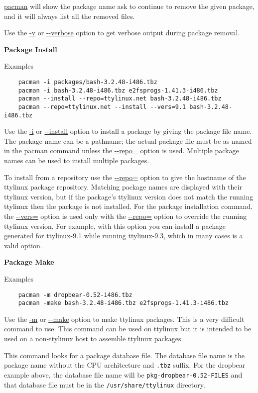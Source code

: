 \documentclass[10pt]{article}
\begin{document}
\url{pacman} will show the package name ask to continue to remove the given
package, and it will always list all the removed files.

Use the \url{-v} or \url{--verbose} option to get verbose output during package
removal.

{\bf Package Install}

Examples
\begin{lstlisting}
	pacman -i packages/bash-3.2.48-i486.tbz
	pacman -i bash-3.2.48-i486.tbz e2fsprogs-1.41.3-i486.tbz
	pacman --install --repo=ttylinux.net bash-3.2.48-i486.tbz
	pacman --repo=ttylinux.net --install --vers=9.1 bash-3.2.48-i486.tbz
\end{lstlisting}

Use the \url{-i} or \url{--install} option to install a package by giving the
package file name. The package name can be a pathname; the actual package file
must be as named in the pacman command unless the \url{--repo=} option is used.
Multiple package names can be used to install multiple packages.

To install from a repository use the \url{--repo=} option to give the hostname
of the ttylinux package repository. Matching package names are displayed with
their ttylinux version, but if the package's ttylinux version does not match
the running ttylinux then the package is not installed. For the package
installation command, the \url{--vers=} option is used only with the
\url{--repo=} option to override the running ttylinux version.  For example,
with this option you can install a package generated for ttylinux-9.1 while
running ttylinux-9.3, which in many cases is a valid option.

{\bf Package Make}

Examples
\begin{lstlisting}
	pacman -m dropbear-0.52-i486.tbz
	pacman -make bash-3.2.48-i486.tbz e2fsprogs-1.41.3-i486.tbz
\end{lstlisting}

Use the \url{-m} or \url{--make} option to make ttylinux packages. This is a
very difficult command to use. This command can be used on ttylinux but it is
intended to be used on a non-ttylinux host to assemble ttylinux packages.

This command looks for a package database file. The database file name is the
package name without the CPU architecture and {\tt .tbz} suffix. For the
dropbear example above, the database file name will be
{\tt pkg-dropbear-0.52-FILES} and that database file must be in the
{\tt /usr/share/ttylinux} directory.
\end{document}
